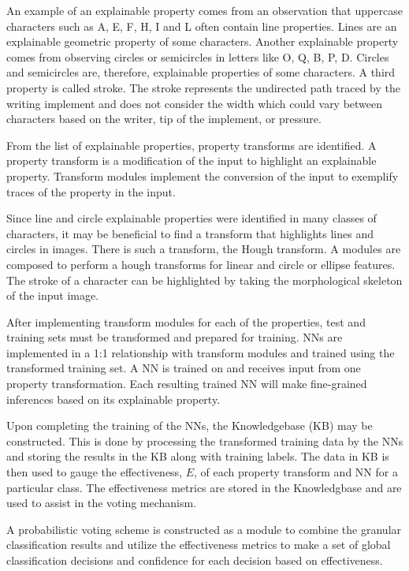 \documentclass[conference]{IEEEtran}
\begin{document}
An example of an explainable property comes from an observation that uppercase
characters such as A, E, F, H, I and L often contain line properties. Lines are
an explainable geometric property of some characters. Another explainable
property comes from observing circles or semicircles in letters like O, Q, B, P,
D. Circles and semicircles are, therefore, explainable properties of some
characters. A third property is called stroke.  The stroke represents the
undirected path traced by the writing implement and does not consider the width
which could vary between characters based on the writer, tip of the implement,
or pressure.

From the list of explainable properties, property transforms are identified.  A
property transform is a modification of the input to highlight an explainable
property.  Transform modules implement the conversion of the input to exemplify
traces of the property in the input.

Since line and circle explainable properties were identified in many classes of
characters, it may be beneficial to find a transform that highlights lines and
circles in images.  There is such a transform, the Hough
transform\cite{Hough1959qva}.  A modules are composed to perform a hough
transforms for linear and circle or ellipse features.  The stroke of a character
can be highlighted by taking the morphological skeleton\cite{LEE1994} of the
input image.

After implementing transform modules for each of the properties, test and
training sets must be transformed and prepared for training. NNs are implemented
in a 1:1 relationship with transform modules and trained using the transformed
training set.  A NN is trained on and receives input from one property
transformation.  Each resulting trained NN will make fine-grained inferences
based on its explainable property.

Upon completing the training of the NNs, the Knowledgebase (KB) may be
constructed. This is done by processing the transformed training data by the
NNs and storing the results in the KB along with training labels.  The data in
KB is then used to gauge the effectiveness, $E$, of each property transform and
NN for a particular class.  The effectiveness metrics are stored in the
Knowledgbase and are used to assist in the voting mechanism.

A probabilistic voting scheme is constructed as a module to combine the granular
classification results and utilize the effectiveness metrics to make a set of
global classification decisions and confidence for each decision based on
effectiveness.
\end{document}
